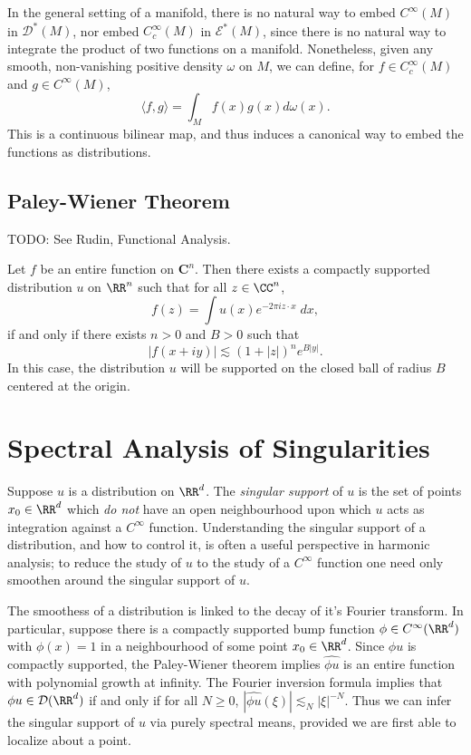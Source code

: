 In the general setting of a manifold, there is no natural way to embed $C^\infty(M)$ in $\mathcal{D}^*(M)$, nor embed $C_c^\infty(M)$ in $\mathcal{E}^*(M)$, since there is no natural way to integrate the product of two functions on a manifold. Nonetheless, given any smooth, non-vanishing positive density $\omega$ on $M$, we can define, for $f \in C_c^\infty(M)$ and $g \in C^\infty(M)$,
%
\[ \langle f, g \rangle = \int_M f(x) g(x) d\omega(x). \]
%
This is a continuous bilinear map, and thus induces a canonical way to embed the functions as distributions.

\section{Paley-Wiener Theorem}

TODO: See Rudin, Functional Analysis.

\begin{theorem}
    Let $f$ be an entire function on $\mathbf{C}^n$. Then there exists a compactly supported distribution $u$ on $\RR^n$ such that for all $z \in \CC^n$,
    \[ f(z) = \int u(x) e^{-2 \pi i z \cdot x}\; dx, \]
    if and only if there exists $n > 0$ and $B > 0$ such that
    \[ |f(x + i y)| \lesssim (1 + |z|)^n e^{B|y|}. \]
    In this case, the distribution $u$ will be supported on the closed ball of radius $B$ centered at the origin.
\end{theorem}







\chapter{Spectral Analysis of Singularities}

Suppose $u$ is a distribution on $\RR^d$. The \emph{singular support} of $u$ is the set of points $x_0 \in \RR^d$ which \emph{do not} have an open neighbourhood upon which $u$ acts as integration against a $C^\infty$ function. Understanding the singular support of a distribution, and how to control it, is often a useful perspective in harmonic analysis; to reduce the study of $u$ to the study of a $C^\infty$ function one need only smoothen around the singular support of $u$.

The smoothess of a distribution is linked to the decay of it's Fourier transform. In particular, suppose there is a compactly supported bump function $\phi \in C^\infty(\RR^d)$ with $\phi(x) = 1$ in a neighbourhood of some point $x_0 \in \RR^d$. Since $\phi u$ is compactly supported, the Paley-Wiener theorem implies $\widehat{\phi u}$ is an entire function with polynomial growth at infinity. The Fourier inversion formula implies that $\phi u \in \mathcal{D}(\RR^d)$ if and only if for all $N \geq 0$, $|\widehat{\phi u}(\xi)| \lesssim_N |\xi|^{-N}$. Thus we can infer the singular support of $u$ via purely spectral means, provided we are first able to localize about a point.


